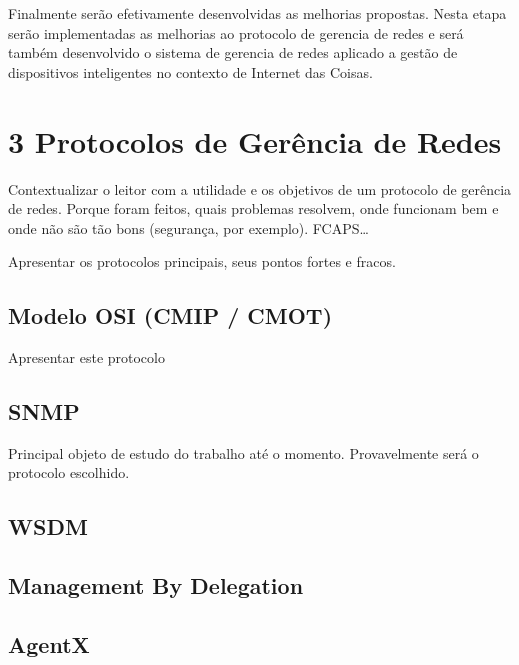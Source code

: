 \documentclass[twoside,english,brazilian]{UNISINOSmonografia}
\begin{document}
	Finalmente serão efetivamente desenvolvidas as melhorias propostas. Nesta 
	etapa serão implementadas as melhorias ao protocolo de gerencia de redes e 
	será também desenvolvido o sistema de gerencia de redes aplicado a gestão 
	de dispositivos inteligentes no contexto de Internet das Coisas.


\chapter{3 Protocolos de Gerência de Redes}


	Contextualizar o leitor com a utilidade e os objetivos de um protocolo
	de gerência de redes. Porque foram feitos, quais problemas resolvem,
	onde funcionam bem e onde não são tão bons (segurança, por exemplo).
	FCAPS\ldots
	
	Apresentar os protocolos principais, seus pontos fortes e fracos.
	
	
	
	\section{Modelo OSI (CMIP / CMOT)}

		Apresentar este protocolo
		
		
		
	\section{SNMP}

		Principal objeto de estudo do trabalho até o momento.
		Provavelmente será o protocolo escolhido.
		
		
	
	\section{WSDM}
	
	
	\section{Management By Delegation}
	
	
	\section{AgentX}
	
\end{document}
